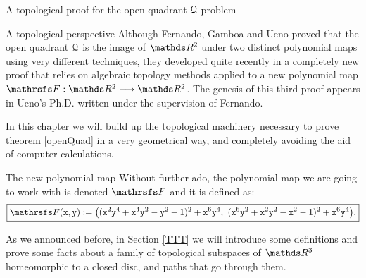 \documentclass[11pt, a4paper, english, twoside, notitlepage, openright]{report}
\begin{document}
\begin{chapter}{A topological proof for the open quadrant $\mathcal{Q}$ problem}
\begin{section}{A topological perspective}
Although Fernando, Gamboa and Ueno proved that the open quadrant $\mathcal{Q}$ is the image of $\R^2$ under two distinct polynomial maps using very different techniques, they developed quite recently in \cite{fgu} a completely new proof that relies on algebraic topology methods applied to a new polynomial map $\FFF: \R^2 \longrightarrow \R^2$. The genesis of this third proof appears in Ueno's Ph.D. \cite{u} written under the supervision of Fernando. 

In this chapter we will build up the topological machinery necessary to prove theorem \ref{openQuad} in a very geometrical way, and completely avoiding the aid of computer calculations.
\begin{subsection}{The new polynomial map}
Without further ado, the polynomial map we are going to work with is denoted $\FFF$ and it is defined as:
\begin{equation*}\label{eq:thirdMap}
\boxed{
\FFF({\tt x}, {\tt y}) := \big(({\tt x}^2{\tt y}^4+{\tt x}^4{\tt y}^2-{\tt y}^2-1)^2+{\tt x}^6{\tt y}^4,\ ({\tt x}^6{\tt y}^2+{\tt x}^2{\tt y}^2-{\tt x}^2-1)^2+{\tt x}^6{\tt y}^4\big).
}
\end{equation*}

As we announced before, in Section \ref{TTT} we will introduce some definitions and prove some facts about a family of topological subspaces of $\R^3$ homeomorphic to a closed disc, and paths that go through them.

\vspace{1mm}


\end{subsection}
\end{section}
\end{chapter}
\end{document}
